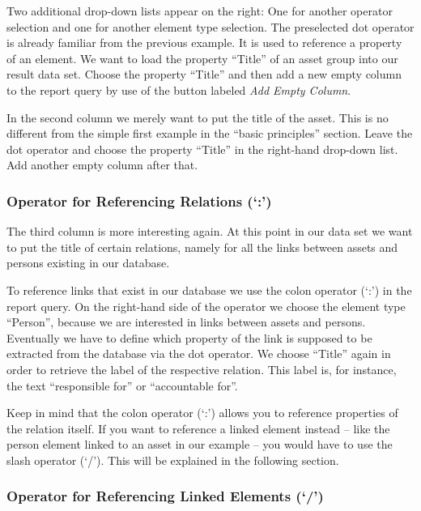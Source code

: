 \documentclass[a4paper,10pt]{book}
\begin{document}
Two additional drop-down lists appear on the right: One for another operator
selection and one for another element type selection. The preselected dot
operator is already familiar from the previous example. It is used to reference
a property of an element. We want to load the property ``Title'' of an asset
group into our result data set. Choose the property ``Title'' and then add a new
empty column to the report query by use of the button labeled \emph{Add Empty
Column}.

In the second column we merely want to put the title of the asset. This is no
different from the simple first example in the ``basic principles'' section.
Leave the dot operator and choose the property ``Title'' in the right-hand
drop-down list. Add another empty column after that.

\subsubsection{\texorpdfstring{Operator for Referencing Relations
(`:')}{Operator for Referencing Relations (:)}}\label{operator-for-referencing-relations}

The third column is more interesting again. At this point in our data set we
want to put the title of certain relations, namely for all the links between
assets and persons existing in our database.

To reference links that exist in our database we use the colon operator (`:') in
the report query. On the right-hand side of the operator we choose the element
type ``Person'', because we are interested in links between assets and persons.
Eventually we have to define which property of the link is supposed to be
extracted from the database via the dot operator. We choose ``Title'' again in
order to retrieve the label of the respective relation. This label is, for
instance, the text ``responsible for'' or ``accountable for''.

Keep in mind that the colon operator (`:') allows you to reference properties of
the relation itself. If you want to reference a linked element instead -- like
the person element linked to an asset in our example -- you would have to use
the slash operator (`/'). This will be explained in the following section.

\subsubsection{\texorpdfstring{Operator for Referencing Linked Elements
(`/')}{Operator for Referencing Linked Elements (/)}}\label{operator-for-referencing-linked-elements}
\end{document}

